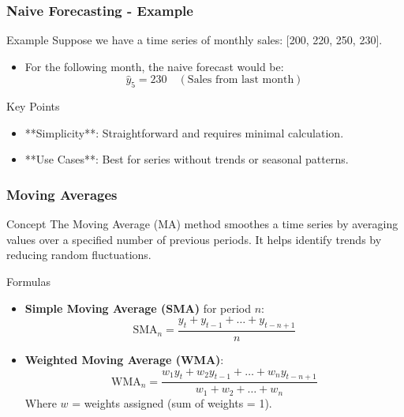 \documentclass[aspectratio=169]{beamer}
\begin{document}
\begin{frame}[fragile]
    \frametitle{Naive Forecasting - Example}
    \begin{block}{Example}
        Suppose we have a time series of monthly sales: [200, 220, 250, 230].
        \begin{itemize}
            \item For the following month, the naive forecast would be:
            \begin{equation}
            \hat{y}_5 = 230 \quad (\text{Sales from last month})
            \end{equation}
        \end{itemize}
    \end{block}

    \begin{block}{Key Points}
        \begin{itemize}
            \item **Simplicity**: Straightforward and requires minimal calculation.
            \item **Use Cases**: Best for series without trends or seasonal patterns.
        \end{itemize}
    \end{block}
\end{frame}

\begin{frame}[fragile]
    \frametitle{Moving Averages}
    \begin{block}{Concept}
        The Moving Average (MA) method smoothes a time series by averaging values over a specified number of previous periods. It helps identify trends by reducing random fluctuations.
    \end{block}

    \begin{block}{Formulas}
        \begin{itemize}
            \item \textbf{Simple Moving Average (SMA)} for period \( n \):
            \begin{equation}
            \text{SMA}_n = \frac{y_t + y_{t-1} + \ldots + y_{t-n+1}}{n}
            \end{equation}

            \item \textbf{Weighted Moving Average (WMA)}:
            \begin{equation}
            \text{WMA}_n = \frac{w_1 y_t + w_2 y_{t-1} + \ldots + w_n y_{t-n+1}}{w_1 + w_2 + \ldots + w_n}
            \end{equation}
            Where \( w \) = weights assigned (sum of weights = 1).
        \end{itemize}
    \end{block}
\end{frame}
\end{document}
